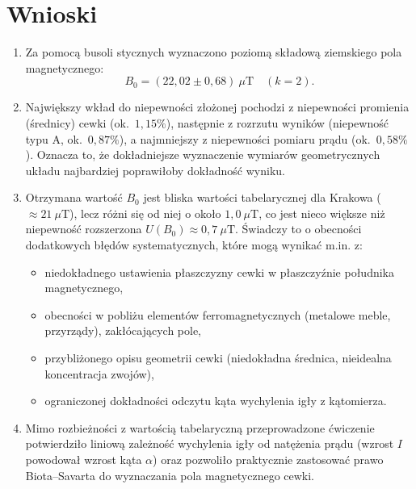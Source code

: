 \documentclass{fizykalab}
\begin{document}
\section{Wnioski}

\begin{enumerate}
  \item Za pomocą busoli stycznych wyznaczono poziomą składową
    ziemskiego pola magnetycznego:
    \[
      B_0 = (22{,}02 \pm 0{,}68)~\mu\text{T}
      \quad (k = 2).
    \]
  \item Największy wkład do niepewności złożonej pochodzi
    z niepewności promienia (średnicy) cewki
    (ok.~\(1{,}15\%\)), następnie z rozrzutu wyników
    (niepewność typu A, ok.~\(0{,}87\%\)), a najmniejszy
    z niepewności pomiaru prądu (ok.~\(0{,}58\%\)).
    Oznacza to, że dokładniejsze wyznaczenie wymiarów
    geometrycznych układu najbardziej poprawiłoby
    dokładność wyniku.
  \item Otrzymana wartość \(B_0\) jest bliska wartości
    tabelarycznej dla Krakowa (\(\approx 21~\mu\text{T}\)),
    lecz różni się od niej o około \(1{,}0~\mu\text{T}\),
    co jest nieco większe niż niepewność rozszerzona
    \(U(B_0) \approx 0{,}7~\mu\text{T}\). Świadczy to
    o obecności dodatkowych błędów systematycznych, które
    mogą wynikać m.in. z:
    \begin{itemize}
      \item niedokładnego ustawienia płaszczyzny cewki
        w płaszczyźnie południka magnetycznego,
      \item obecności w pobliżu elementów ferromagnetycznych
        (metalowe meble, przyrządy), zakłócających pole,
      \item przybliżonego opisu geometrii cewki
        (niedokładna średnica, nieidealna koncentracja
        zwojów),
      \item ograniczonej dokładności odczytu kąta
        wychylenia igły z kątomierza.
    \end{itemize}
  \item Mimo rozbieżności z wartością tabelaryczną przeprowadzone
    ćwiczenie potwierdziło liniową zależność wychylenia igły
    od natężenia prądu (wzrost \(I\) powodował wzrost kąta
    \(\alpha\)) oraz pozwoliło praktycznie zastosować prawo
    Biota--Savarta do wyznaczania pola magnetycznego cewki.
\end{enumerate}
\end{document}

